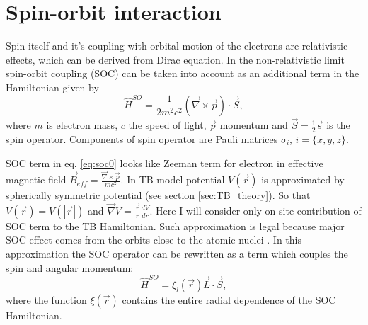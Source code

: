 \newpage
\section{Spin-orbit interaction}
\label{sec:soc_theory}
Spin itself and it's coupling with orbital motion of the electrons are relativistic effects, which can be derived from Dirac equation. In the non-relativistic limit spin-orbit coupling (SOC) can be taken into account as an additional term in the Hamiltonian given by
\begin{equation} \label{eq:soc0}
	\hat{H}^{SO} = \frac{1}{2 m^2 c^2} (\vec{\nabla} \times \vec{p}) \cdot \vec{S},
\end{equation}
where $m$ is electron mass, $c$ the speed of light, $\vec{p}$ momentum and $\vec{S} = \frac{1}{2} \vec{s}$ is the spin operator. Components of spin operator are Pauli matrices $\sigma_i$, $i = \{x, y, z\}$.

SOC term in eq. \ref{eq:soc0} looks like Zeeman term for electron in effective magnetic field $\vec{B}_{eff} = \frac{\vec{\nabla} \times \vec{p}}{m c^2}$. In TB model potential $V(\vec{r})$ is approximated by spherically symmetric potential (see section \ref{sec:TB_theory}). So that $V(\vec{r}) = V(|\vec{r}|)$ and $\vec{\nabla} V = \frac{\vec{r}}{r} \frac{dV}{dr}$. Here I will consider only on-site contribution of SOC term to the TB Hamiltonian. Such approximation is legal because major SOC effect comes from the orbits close to the atomic nuclei \cite{soc}. In this approximation the SOC operator can be rewritten as a term which couples the spin and angular momentum: 
\begin{equation} \label{eq:hsoc}
	\hat{H}^{SO} =  \xi_l(\vec{r}) \vec{L} \cdot \vec{S},
\end{equation}
where the function $\xi(\vec{r})$ contains the entire radial dependence of the SOC Hamiltonian.

